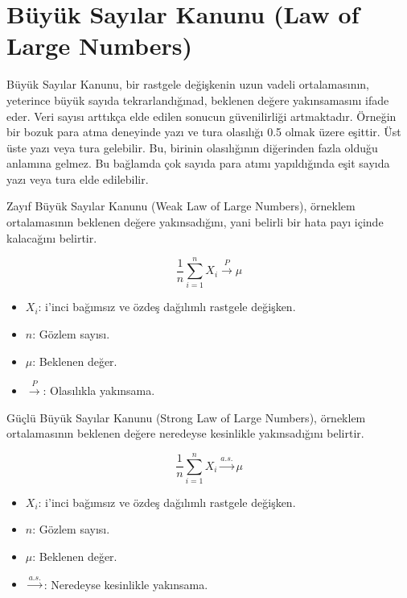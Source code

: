 \section{Büyük Sayılar Kanunu (Law of Large Numbers)}
Büyük Sayılar Kanunu, bir rastgele değişkenin uzun vadeli ortalamasının, yeterince büyük sayıda tekrarlandığınad, beklenen değere yakınsamasını ifade eder. Veri sayısı arttıkça elde edilen sonucun güvenilirliği artmaktadır. Örneğin bir bozuk para atma deneyinde yazı ve tura olasılığı 0.5 olmak üzere eşittir. Üst üste yazı veya tura gelebilir. Bu, birinin olasılığının diğerinden fazla olduğu anlamına gelmez. Bu bağlamda çok sayıda para atımı yapıldığında eşit sayıda yazı veya tura elde edilebilir.

Zayıf Büyük Sayılar Kanunu (Weak Law of Large Numbers), örneklem ortalamasının beklenen değere yakınsadığını, yani belirli bir hata payı içinde kalacağını belirtir.

\[ \frac{1}{n} \sum_{i=1}^{n} X_i \xrightarrow{P} \mu \]

\begin{itemize}
	\item $X_i$: i'inci bağımsız ve özdeş dağılımlı rastgele değişken.
	\item $n$: Gözlem sayısı.
	\item $\mu$: Beklenen değer.
	\item $\xrightarrow{P}$: Olasılıkla yakınsama.
\end{itemize}

Güçlü Büyük Sayılar Kanunu (Strong Law of Large Numbers), örneklem ortalamasının beklenen değere neredeyse kesinlikle yakınsadığını belirtir.

\[ \frac{1}{n} \sum_{i=1}^{n} X_i \xrightarrow{a.s.} \mu \]

\begin{itemize}
	\item $X_i$: i'inci bağımsız ve özdeş dağılımlı rastgele değişken.
	\item $n$: Gözlem sayısı.
	\item $\mu$: Beklenen değer.
	\item $\xrightarrow{a.s.}$: Neredeyse kesinlikle yakınsama.
\end{itemize}




\newpage